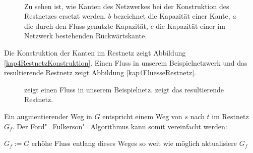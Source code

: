 \begin{figure}[htb]
  \centering
  \\
  \caption{Zu sehen ist, wie Kanten des Netzwerkes bei der Konstruktion des Restnetzes ersetzt werden. $b$ bezeichnet die Kapazität einer Kante, $a$ die durch den Fluss genutzte Kapazität, $c$ die Kapazität einer im Netzwerk bestehenden Rückwärtskante.}
  \label{kap4RestnetzKonstruktion}
\end{figure}

Die Konstruktion der Kanten im Restnetz zeigt Abbildung \vref{kap4RestnetzKonstruktion}. Einen Fluss in unserem Beispielnetzwerk und das resultierende Restnetz zeigt Abbildung \vref{kap4FluesseRestnetz}.

\begin{figure}[htb]
  \centering
  \hspace{.025\textwidth}
  \caption{ zeigt einen Fluss in unserem Beispielnetz.  zeigt das resultierende Restnetz.}
  \label{kap4FluesseRestnetz}
\end{figure}

Ein augmentierender Weg in $G$ entspricht einem Weg von $s$ nach $t$ im Restnetz $G_f$. Der Ford"=Fulkerson"=Algorithmus kann somit vereinfacht werden:

\begin{Alg}[Ford"=Fulkerson mit Hilfsstruktur $G_f$]
  \begin{algorithmic}[1]
    \State $G_f := G$
      \State erhöhe Fluss entlang dieses Weges so weit wie möglich
      \State aktualisiere $G_f$
    \EndWhile
  \end{algorithmic}
\end{Alg}

